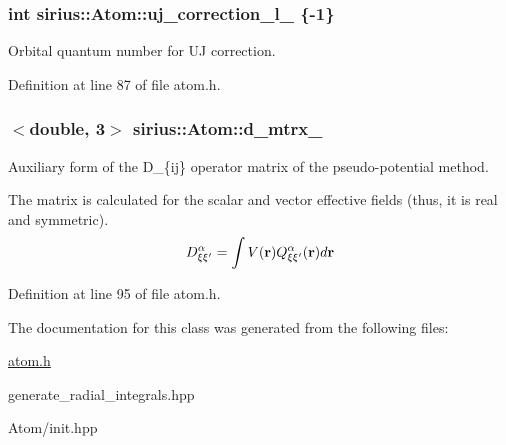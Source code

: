 \subsubsection[{uj\+\_\+correction\+\_\+l\+\_\+}]{\setlength{\rightskip}{0pt plus 5cm}int sirius\+::\+Atom\+::uj\+\_\+correction\+\_\+l\+\_\+ \{-\/1\}\hspace{0.3cm}{\ttfamily [private]}}\label{classsirius_1_1_atom_adcf069a095d4f0f9b1c5debe34e6ed94}


Orbital quantum number for U\+J correction. 



Definition at line 87 of file atom.\+h.

\hypertarget{classsirius_1_1_atom_a735ddc6a81305dbc5b2ddf5d96b6baaa}{}
\subsubsection[{d\+\_\+mtrx\+\_\+}]{$<$double, 3$>$ sirius\+::\+Atom\+::d\+\_\+mtrx\+\_\+\hspace{0.3cm}{\ttfamily [private]}}\label{classsirius_1_1_atom_a735ddc6a81305dbc5b2ddf5d96b6baaa}


Auxiliary form of the D\+\_\+\{ij\} operator matrix of the pseudo-\/potential method. 

The matrix is calculated for the scalar and vector effective fields (thus, it is real and symmetric). \[ D_{\xi \xi'}^{\alpha} = \int V({\bf r}) Q_{\xi \xi'}^{\alpha}({\bf r}) d{\bf r} \] 

Definition at line 95 of file atom.\+h.



The documentation for this class was generated from the following files\+:\begin{DoxyCompactItemize}
\item 
\hyperlink{atom_8h}{atom.\+h}\item 
generate\+\_\+radial\+\_\+integrals.\+hpp\item 
Atom/init.\+hpp\end{DoxyCompactItemize}
